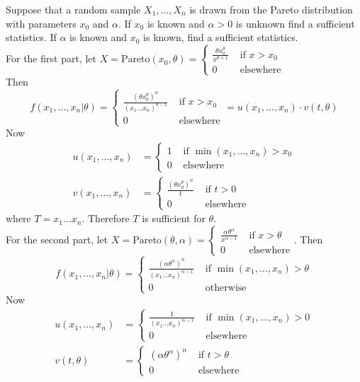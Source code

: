 \documentclass[12pt]{article}
\begin{document}
Suppose that a random sample $X_1,\dots,X_n$ is drawn from the Pareto distribution with parameters $x_0$ and $\alpha$. If $x_0$ is known and $\alpha > 0$ is unknown find a sufficient statistics. If $\alpha$ is known and $x_0$ is known, find a sufficient statistics. \\
For the first part, let $X = \text{Pareto}(x_0,\theta) = \begin{cases} \frac{\theta x_0^\theta}{x^{\theta + 1}} &\text{ if } x > x_0 \\ 0 &\text{ elsewhere } \end{cases} $ \\
Then $$ f(x_1,\dots,x_n|\theta) = \begin{cases} \frac{(\theta x_0^\theta)^n}{(x_1 \dots x_n)^{\theta - 1}} &\text{ if } x > x_0 \\ 0 &\text{ elsewhere} \end{cases} = u(x_1,\dots,x_n)\cdot v(t,\theta) $$ 
Now $$ \begin{aligned} u(x_1,\dots,x_n) &= \begin{cases} 1 &\text{ if } \min(x_1,\dots,x_n) > x_0 \\ 0 &\text{ elsewhere} \end{cases} \\ v(x_1,\dots,x_n) &= \begin{cases} \frac{(\theta x_0^\theta)^n}{t} &\text{ if } t > 0 \\ 0 &\text{ elsewhere} \end{cases} \end{aligned} $$ 
where $T = x_1\dots x_n$. Therefore $T$ is sufficient for $\theta$. \\ 
For the second part, let $X = \text{Pareto}(\theta,\alpha) = \begin{cases} \frac{\alpha \theta^\alpha}{x^{\alpha - 1}} &\text{ if } x > \theta \\ 0 &\text{ elsewhere} \end{cases}$.  Then 
$$f(x_1,\dots,x_n|\theta) = \begin{cases} \frac{(\alpha \theta^\alpha)^n}{(x_1\dots x_n)^{\alpha-1}} &\text{ if } \min(x_1,\dots,x_n) > \theta \\ 0 &\text{ otherwise} \end{cases} $$
Now $$ \begin{aligned} u(x_1,\dots,x_n) &= \begin{cases} \frac{1}{(x_1\dots x_n)^{\alpha -1}} &\text{ if } \min(x_1,\dots,x_n) > 0 \\ 0 &\text{ elsewhere} \end{cases} \\ v(t,\theta) &= \begin{cases} (\alpha \theta^\alpha)^n &\text{ if } t > \theta \\ 0 &\text{ elsewhere} \end{cases} \end{aligned} $$
\end{document}
